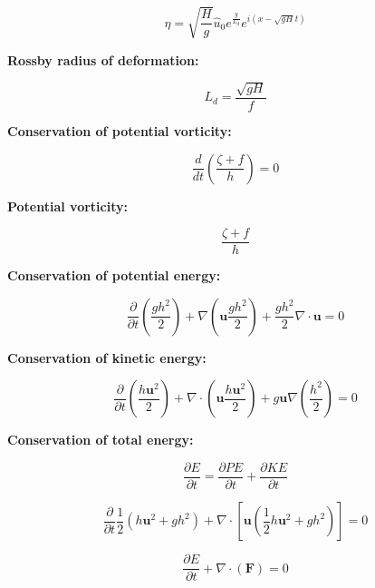 \documentclass[12pt]{article}
\numberwithin{equation}{section}
\numberwithin{figure}{section}
\numberwithin{table}{section}
\begin{document}
\begin{equation}
  \eta = \sqrt{\frac{H}{g}} \widehat{u}_0 e^{\frac{y}{L_d}} e^{i(x - \sqrt{gH} t)}
\end{equation}

\textbf{Rossby radius of deformation:}

\begin{equation}
  L_d = \frac{\sqrt{gH}}{f}
\end{equation}

\textbf{Conservation of potential vorticity:}

\begin{equation}
  \frac{d}{dt} \left( \frac{\zeta + f}{h} \right) = 0
\end{equation}

\textbf{Potential vorticity:}

\begin{equation}
  \frac{\zeta + f}{h}
\end{equation}

\textbf{Conservation of potential energy:}

\begin{equation}
  \frac{\partial}{\partial t} \left( \frac{gh^2}{2} \right) +
  \nabla \left( \mathbf{u} \frac{gh^2}{2} \right) +
  \frac{gh^2}{2} \nabla \cdot \mathbf{u} = 0
\end{equation}

\textbf{Conservation of kinetic energy:}

\begin{equation}
  \frac{\partial}{\partial t} \left( \frac{h \mathbf{u}^2}{2} \right)
  + \nabla \cdot \left( \mathbf{u} \frac{h \mathbf{u}^2}{2} \right)
  + g\mathbf{u}\nabla \left(\frac{h^2}{2}\right)
  = 0
\end{equation}

\textbf{Conservation of total energy:}

\begin{equation}
  \frac{\partial E}{\partial t} = \frac{\partial PE}{\partial t} + \frac{\partial KE}{\partial t}
\end{equation}

\begin{equation}
  \frac{\partial}{\partial t} \frac{1}{2} \left(h\mathbf{u}^2 + gh^2\right)
  + \nabla \cdot \left[ \mathbf{u} \left( \frac{1}{2} h\mathbf{u}^2 + gh^2\right) \right] = 0
\end{equation}

\begin{equation}
  \frac{\partial E}{\partial t} + \nabla \cdot \left( \mathbf{F} \right) = 0
\end{equation}
\end{document}
